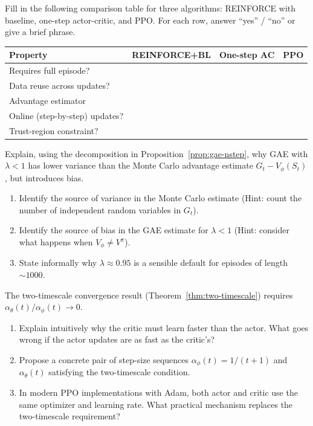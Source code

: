 \begin{exercise}
\label{ex:ac-comparison-table}
Fill in the following comparison table for three algorithms:
REINFORCE with baseline, one-step actor-critic, and PPO.
For each row, answer ``yes'' / ``no'' or give a brief phrase.

\begin{center}
\begin{tabular}{@{}lccc@{}}
\toprule
Property & REINFORCE+BL & One-step AC & PPO \\
\midrule
Requires full episode?         & & & \\
Data reuse across updates?     & & & \\
Advantage estimator            & & & \\
Online (step-by-step) updates? & & & \\
Trust-region constraint?       & & & \\
\bottomrule
\end{tabular}
\end{center}
\end{exercise}

\begin{exercise}
\label{ex:gae-bias-variance}
Explain, using the decomposition in Proposition~\ref{prop:gae-nstep},
why GAE with $\lambda < 1$ has lower variance than the Monte Carlo advantage
estimate $G_t - V_\phi(S_t)$, but introduces bias.
\begin{enumerate}[label=(\alph*)]
  \item Identify the source of variance in the Monte Carlo estimate
    (Hint: count the number of independent random variables in $G_t$).
  \item Identify the source of bias in the GAE estimate for $\lambda < 1$
    (Hint: consider what happens when $V_\phi \neq V^\pi$).
  \item State informally why $\lambda \approx 0.95$ is a sensible
    default for episodes of length $\sim 1000$.
\end{enumerate}
\end{exercise}

\begin{exercise}
\label{ex:two-timescale}
The two-timescale convergence result (Theorem~\ref{thm:two-timescale})
requires $\alpha_\theta(t)/\alpha_\phi(t) \to 0$.
\begin{enumerate}[label=(\alph*)]
  \item Explain intuitively why the critic must learn faster than the actor.
    What goes wrong if the actor updates are as fast as the critic's?
  \item Propose a concrete pair of step-size sequences
    $\alpha_\phi(t) = 1/(t+1)$ and $\alpha_\theta(t)$ satisfying the
    two-timescale condition.
  \item In modern PPO implementations with Adam, both actor and critic use
    the same optimizer and learning rate.  What practical mechanism replaces
    the two-timescale requirement?
\end{enumerate}
\end{exercise}

